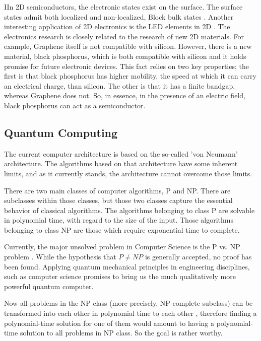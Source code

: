 IIn 2D semiconductors, the electronic states exist
on the surface. The surface states admit both localized and non-localized, Block bulk states \cite{LocStates}.
Another interesting application of 2D electronics is the LED elements in 2D \cite{2DLED}. The electronics research is closely related to the research of new 2D materials. For example, Graphene itself is not compatible with silicon. However, there is a new material, black phosphorus\cite{2DPhos}, which is both compatible with silicon and it holds promise for future electronic\cite{2DPhos3} devices. This fact relies on two key properties; the first is that black phosphorus has higher mobility, the speed at which it can carry an electrical charge, than silicon. The other is that it has a finite bandgap, whereas Graphene does not. So, in essence, in the presence of an electric field, black phosphorus can act as a semiconductor\cite{2DPhos2}.

\subsection*{Quantum Computing}

The current computer architecture is based on the so-called 'von Neumann' architecture. The algorithms based on that architecture have some inherent limits, and as it currently stands, the architecture cannot overcome those limits.

There are two main classes of computer algorithms, P and NP. There are subclasses within those classes, but those two classes capture the essential behavior of classical algorithms. The algorithms belonging to class P are solvable in polynomial time, with regard to the size of the input. Those algorithms belonging to class NP are those which require exponential time to complete\cite{PvsNP}.

Currently, the major unsolved problem in Computer Science is the P vs. NP problem \cite{PvsNP}. While the hypothesis that $ P \neq NP $ is generally accepted, no proof has been found. Applying quantum mechanical principles in engineering disciplines, such as computer science \cite{FQC} promises to bring us the much qualitatively more powerful quantum computer. 

 Now all problems in the NP class (more precisely, NP-complete subclass) can be transformed into each other in polynomial time to each other \cite{NPComplete},  therefore finding a polynomial-time solution for one of them would amount to having a polynomial-time solution to all problems in NP class. So the goal is rather worthy. 

